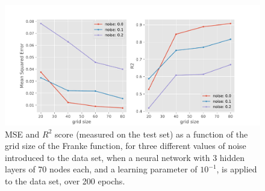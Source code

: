 \begin{figure}
    \centering
    \includegraphics[scale=0.65]{Figures/Regression/grid-mse-analysis7.pdf}
    \caption{MSE and $R^2$ score (measured on the test set) as a function of the grid size of the Franke function, for three different values of noise introduced to the data set, when a neural network with 3 hidden layers of 70 nodes each, and a learning parameter of $10^{-1}$, is applied to the data set, over 200 epochs.}
    \label{fig:regression_gridsize}
\end{figure}

